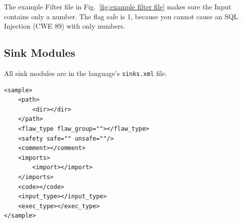 \documentclass[12pt]{article}
\begin{document}
The example Filter file in Fig.~\ref{fig:example filter file} makes sure
the Input contains only a number.  
The flag safe is 1, because you cannot cause an SQL Injection 
(CWE 89) with only numbers.


\subsection{Sink Modules}
\label{sec:sink modules}

All sink modules are in the language's \verb|sinks.xml| file.

\begin{verbatim}
<sample>
    <path>
        <dir></dir>
    </path>
    <flaw_type flaw_group=""></flaw_type>
    <safety safe="" unsafe=""/>
    <comment></comment>
    <imports>
        <import></import>
    </imports>
    <code></code>
    <input_type></input_type>
    <exec_type></exec_type>
</sample>
\end{verbatim}
\end{document}
